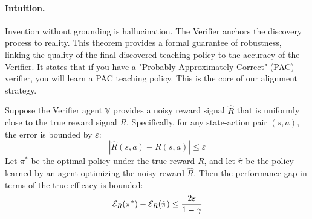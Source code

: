 \paragraph{Intuition.} Invention without grounding is hallucination. The Verifier anchors the discovery process to reality. This theorem provides a formal guarantee of robustness, linking the quality of the final discovered teaching policy to the accuracy of the Verifier. It states that if you have a "Probably Approximately Correct" (PAC) verifier, you will learn a PAC teaching policy. This is the core of our alignment strategy.

\begin{theorem}
\label{thm:pac_verifier}
Suppose the Verifier agent $\mathbb{V}$ provides a noisy reward signal $\hat{R}$ that is uniformly close to the true reward signal $R$. Specifically, for any state-action pair $(s,a)$, the error is bounded by $\varepsilon$:
\[ |\hat{R}(s,a) - R(s,a)| \le \varepsilon \]
Let $\pi^*$ be the optimal policy under the true reward $R$, and let $\hat{\pi}$ be the policy learned by an agent optimizing the noisy reward $\hat{R}$. Then the performance gap in terms of the true efficacy is bounded:
\[ \mathcal{E}_R(\pi^*) - \mathcal{E}_R(\hat{\pi}) \le \frac{2\varepsilon}{1-\gamma} \]
\end{theorem}
